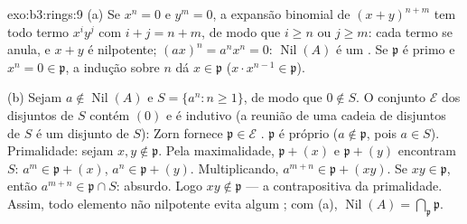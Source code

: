 \begin{solution}{exo:b3:rings:9}
(a) Se $x^n = 0$ e $y^m = 0$, a expansão binomial de $(x+y)^{n+m}$ tem todo termo
$x^iy^j$ com $i + j = n + m$, de modo que $i
\geq n$ ou $j \geq m$: cada termo se anula,
e $x + y$ é nilpotente; $(ax)^n = a^nx^n = 0$: $\operatorname{Nil}(A)$ é um . Se $\mathfrak p$ é primo e
$x^n = 0 \in \mathfrak p$, a indução sobre $n$ dá $x \in \mathfrak p$ ($x \cdot x^{n-1} \in
\mathfrak p$).

(b) Sejam $a \notin \operatorname{Nil}(A)$ e $S = \{a^n : n \geq
1\}$, de modo que $0 \notin S$. O conjunto $\mathcal E$ dos 
disjuntos de $S$ contém $(0)$ e é indutivo (a reunião de uma
cadeia de  disjuntos de $S$ é um  disjunto de $S$):
Zorn fornece $\mathfrak p \in \mathcal E$ . $\mathfrak p$ é próprio ($a \notin \mathfrak p$, pois $a \in S$).
Primalidade: sejam $x, y \notin \mathfrak p$. Pela maximalidade, $\mathfrak p + (x)$ e $\mathfrak p + (y)$ encontram
$S$: $a^m \in \mathfrak p + (x)$, $a^n
\in \mathfrak p + (y)$. Multiplicando, $a^{m+n} \in \mathfrak p +
(xy)$. Se $xy \in \mathfrak p$, então $a^{m+n} \in \mathfrak p \cap
S$:
absurdo. Logo $xy \notin \mathfrak p$ --- a contrapositiva da primalidade. Assim, todo
elemento não nilpotente evita algum ; com (a), $\operatorname{Nil}(A) = \bigcap_{\mathfrak p} \mathfrak p$.
\end{solution}

